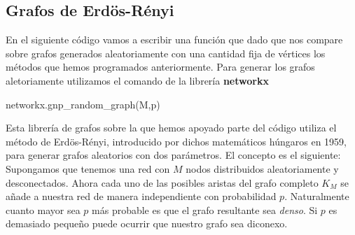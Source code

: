 \documentclass[twoside,a4paper,openright,12pt,tikz]{book}
\begin{document}
\subsection{Grafos de Erdös-Rényi}
En el siguiente código vamos a escribir una función que dado que nos compare sobre grafos generados aleatoriamente con una cantidad fija de vértices los métodos que hemos programados anteriormente. Para generar los grafos aletoriamente utilizamos el comando de la librería \textbf{networkx}\\
\begin{pythone}
networkx.gnp_random_graph(M,p)
\end{pythone}
Esta librería de grafos sobre la que hemos apoyado parte del código utiliza el método de Erdös-Rényi, introducido por dichos matemáticos húngaros en 1959, para generar grafos aleatorios con dos parámetros. El concepto es el siguiente: Supongamos que tenemos una red con $M$ nodos distribuidos aleatoriamente y desconectados. Ahora cada uno de las posibles aristas del grafo completo $K_M$ se añade a nuestra red de manera independiente con probabilidad $p$. Naturalmente cuanto mayor sea $p$ más probable es que el grafo resultante sea \textit{denso}. Si $p$ es demasiado pequeño puede ocurrir que nuestro grafo sea diconexo. 
\\
\end{document}
